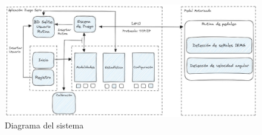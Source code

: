 \begin{figure}[ht]
    \centering
    \includegraphics[scale=0.3]{images/system.jpg}
    \caption{Diagrama del sistema}
    \label{fig: system}
\end{figure}